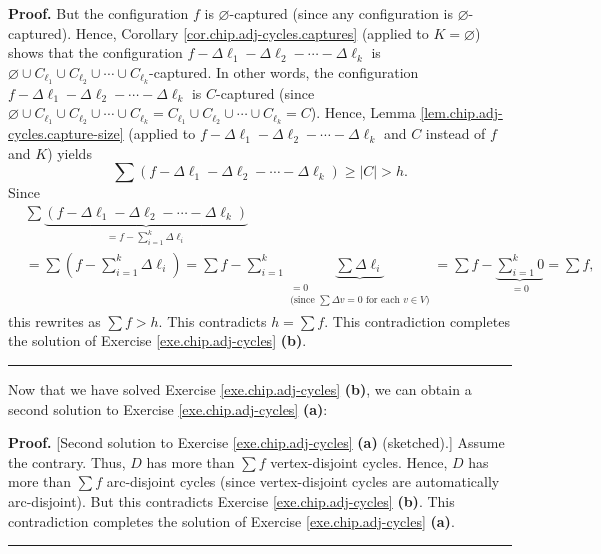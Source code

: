 \documentclass[numbers=enddot,12pt,final,onecolumn,notitlepage]{scrartcl}%
\theoremstyle{definition}
\newenvironment{proof}[1][Proof]{\noindent\textbf{#1.} }{\ \rule{0.5em}{0.5em}}
\let\sumnonlimits\sum
\renewcommand{\sum}{\sumnonlimits\limits}
\begin{document}
\begin{proof}
But the configuration $f$ is $\varnothing$-captured (since any configuration
is $\varnothing$-captured). Hence, Corollary
\ref{cor.chip.adj-cycles.captures} (applied to $K=\varnothing$) shows that the
configuration $f-\Delta\ell_{1}-\Delta\ell_{2}-\cdots-\Delta\ell_{k}$ is
$\varnothing\cup C_{\ell_{1}}\cup C_{\ell_{2}}\cup\cdots\cup C_{\ell_{k}}%
$-captured. In other words, the configuration $f-\Delta\ell_{1}-\Delta\ell
_{2}-\cdots-\Delta\ell_{k}$ is $C$-captured (since $\varnothing\cup
C_{\ell_{1}}\cup C_{\ell_{2}}\cup\cdots\cup C_{\ell_{k}}=C_{\ell_{1}}\cup
C_{\ell_{2}}\cup\cdots\cup C_{\ell_{k}}=C$). Hence, Lemma
\ref{lem.chip.adj-cycles.capture-size} (applied to $f-\Delta\ell_{1}-\Delta\ell
_{2}-\cdots-\Delta\ell_{k}$ and $C$ instead of $f$ and $K$) yields%
\[
\sum\left(  f-\Delta\ell_{1}-\Delta\ell_{2}-\cdots-\Delta\ell_{k}\right)
\geq\left\vert C\right\vert >h.
\]
Since%
\begin{align*}
& \sum\underbrace{\left(  f-\Delta\ell_{1}-\Delta\ell_{2}-\cdots-\Delta
\ell_{k}\right)  }_{=f-\sum_{i=1}^{k}\Delta\ell_{i}}\\
& =\sum\left(  f-\sum_{i=1}^{k}\Delta\ell_{i}\right)  =\sum f-\sum_{i=1}%
^{k}\underbrace{\sum\Delta\ell_{i}}_{\substack{=0\\\text{(since }\sum\Delta
v=0\text{ for each }v\in V\text{)}}}=\sum f-\underbrace{\sum_{i=1}^{k}0}%
_{=0}=\sum f,
\end{align*}
this rewrites as $\sum f>h$. This contradicts $h=\sum f$. This contradiction
completes the solution of Exercise \ref{exe.chip.adj-cycles} \textbf{(b)}.
\end{proof}

Now that we have solved Exercise \ref{exe.chip.adj-cycles} \textbf{(b)}, we
can obtain a second solution to Exercise \ref{exe.chip.adj-cycles}
\textbf{(a)}:

\begin{proof}
[Second solution to Exercise \ref{exe.chip.adj-cycles} \textbf{(a)} (sketched).]
Assume the contrary. Thus, $D$ has more than $\sum f$ vertex-disjoint cycles.
Hence, $D$ has more than $\sum f$ arc-disjoint cycles (since vertex-disjoint
cycles are automatically arc-disjoint). But this contradicts Exercise
\ref{exe.chip.adj-cycles} \textbf{(b)}.  This contradiction completes the
solution of Exercise \ref{exe.chip.adj-cycles} \textbf{(a)}.
\end{proof}
\end{document}
